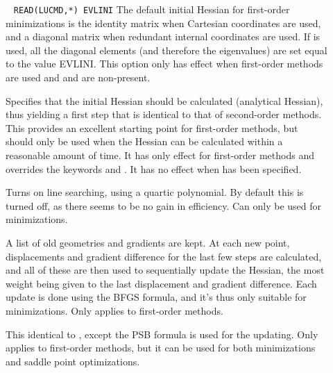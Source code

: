 \begin{description}
\item[]\verb| |
\newline
\verb|READ(LUCMD,*) EVLINI|
The default initial Hessian for first-order
minimizations is the
identity matrix when Cartesian coordinates are used, and a diagonal
matrix when redundant internal coordinates are used. If 
is used, all the diagonal elements (and therefore the eigenvalues) are
set equal to the value EVLINI. This option only has effect when
first-order methods are used and  and  are
non-present.

\item[]
Specifies that the initial Hessian should be
calculated (analytical Hessian), thus yielding a first step that is
identical to that of second-order methods. This provides an excellent starting
point for first-order methods, but should only be used when the
Hessian can be calculated within a reasonable amount of time. It has only
effect for first-order methods and overrides the keywords
 and . It has no effect when  has
been specified.


\item[]
Turns on line searching,
using a quartic polynomial. By default this
is turned off, as there seems to be no gain in efficiency. Can only be
used for minimizations.

\item[]
A list of old geometries and gradients are kept. At each new point,
displacements and gradient difference for the last few steps are
calculated, and all of these are then used to sequentially update the
Hessian, the most weight being given to the last displacement and
gradient difference. Each update is done using the BFGS formula, and
it's thus only suitable for minimizations. Only applies to first-order
methods.

\item[]
This identical to , except the PSB formula is used for the
updating. Only applies to first-order methods, but it can be used for both minimizations and saddle
point optimizations.


\end{description}
